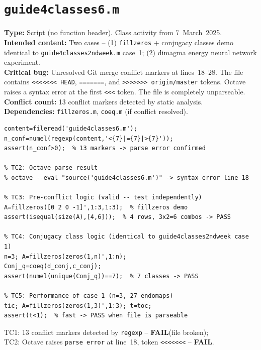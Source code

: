 \documentclass[12pt,a4paper]{report}
\newcommand{\mf}[1]{\texttt{#1}}
\newcommand{\FAIL}{\textcolor{red!70!black}{\textbf{FAIL}}}
\begin{document}
\chapter{\mf{guide4classes6.m}}
\begin{tcolorbox}[Abox,title=Analysis]
\textbf{Type:} Script (no function header). Class activity from 7~March~2025.\\
\textbf{Intended content:} Two cases -- (1) \mf{fillzeros} + conjugacy classes demo identical to \mf{guide4classes2ndweek.m} case~1; (2) dimagma energy neural network experiment.\\[4pt]
\textbf{Critical bug:} Unresolved Git merge conflict markers at lines~18--28. The file contains \texttt{<<<<<<< HEAD}, \texttt{=======}, and \texttt{>>>>>>> origin/master} tokens. Octave raises a syntax error at the first \texttt{<<<} token. The file is completely unparseable.\\[4pt]
\textbf{Conflict count:} 13 conflict markers detected by static analysis.\\[4pt]
\textbf{Dependencies:} \mf{fillzeros.m}, \mf{coeq.m} (if conflict resolved).
\end{tcolorbox}
\begin{lstlisting}[caption={Tests for guide4classes6.m (static analysis + logic verification)}]
% TC1: Conflict markers detected (static analysis)
content=fileread('guide4classes6.m');
n_conf=numel(regexp(content,'<{7}|={7}|>{7}'));
assert(n_conf>0);  % 13 markers -> parse error confirmed

% TC2: Octave parse result
% octave --eval "source('guide4classes6.m')" -> syntax error line 18

% TC3: Pre-conflict logic (valid -- test independently)
A=fillzeros([0 2 0 -1]',1:3,1:3);  % fillzeros demo
assert(isequal(size(A),[4,6]));  % 4 rows, 3x2=6 combos -> PASS

% TC4: Conjugacy class logic (identical to guide4classes2ndweek case 1)
n=3; A=fillzeros(zeros(1,n)',1:n);
Conj_q=coeq(d_conj,c_conj);
assert(numel(unique(Conj_q))==7);  % 7 classes -> PASS

% TC5: Performance of case 1 (n=3, 27 endomaps)
tic; A=fillzeros(zeros(1,3)',1:3); t=toc;
assert(t<1);  % fast -> PASS when file is parseable
\end{lstlisting}
\begin{tcolorbox}[Fbox,title=TC1--TC2 -- Parse failure confirmed]
TC1: 13 conflict markers detected by \mf{regexp} -- \FAIL (file broken);\\
TC2: Octave raises \texttt{parse error} at line~18, token \texttt{<<<<<<<} -- \FAIL.
\end{tcolorbox}
\end{document}

